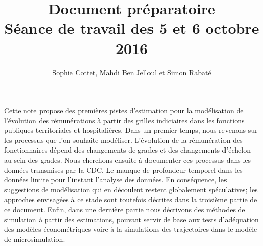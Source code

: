 \documentclass[11pt,a4paper]{article}
\begin{document}
\title{Document préparatoire \\ Séance de travail des 5 et 6 octobre 2016}


\author{Sophie Cottet, Mahdi Ben Jelloul et Simon Rabat\'e}


\maketitle

Cette note propose des premières pistes d'estimation pour la modélisation de l'évolution des rémunérations à partir des grilles indiciaires dans les fonctions publiques territoriales et hospitalières. 
Dans un premier temps, nous revenons sur les processus que l'on souhaite modéliser. L'évolution de la rémunération des fonctionnaires dépend des changements de grades et des changements d'échelon au sein des grades. Nous cherchons ensuite à documenter ces processus dans les données transmises par la CDC. Le manque de profondeur temporel dans les données limite pour l'instant l'analyse des données. En conséquence, les suggestions de modélisation qui en découlent restent globalement spéculatives; les approches envisagées à ce stade sont toutefois décrites dans la troisième partie de ce document. Enfin, dans une dernière partie nous décrivons des méthodes de simulation à partir des estimations, pouvant servir de base aux tests d'adéquation des modèles économétriques voire à la simulations des trajectoires dans le modèle de microsimulation. 













\end{document}
